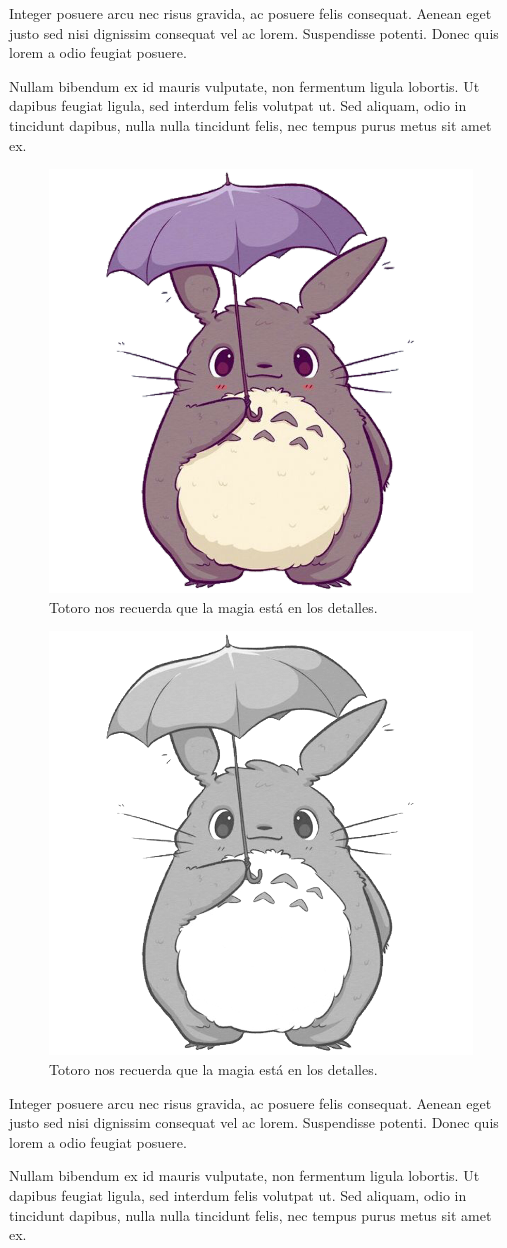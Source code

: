 Integer posuere arcu nec risus gravida, ac posuere felis consequat. Aenean eget justo sed nisi dignissim consequat vel ac lorem. Suspendisse potenti. Donec quis lorem a odio feugiat posuere.

Nullam bibendum ex id mauris vulputate, non fermentum ligula lobortis. Ut dapibus feugiat ligula, sed interdum felis volutpat ut. Sed aliquam, odio in tincidunt dapibus, nulla nulla tincidunt felis, nec tempus purus metus sit amet ex.

\ifPDF
\begin{figure}[!ht]
\centering
\includegraphics[width=.5\textwidth]{./media/avatar.png}
\caption{Totoro nos recuerda que la magia está en los detalles.}\label{figura3-1}
\end{figure}
	\else
	\ifBNPDF
	\begin{figure}[!ht]
	\centering
	\includegraphics[width=.5\textwidth]{./media/avatar2.png}
	\caption{Totoro nos recuerda que la magia está en los detalles.}\label{figura3-1}
	\end{figure}
	\fi
\fi

Integer posuere arcu nec risus gravida, ac posuere felis consequat. Aenean eget justo sed nisi dignissim consequat vel ac lorem. Suspendisse potenti. Donec quis lorem a odio feugiat posuere.

Nullam bibendum ex id mauris vulputate, non fermentum ligula lobortis. Ut dapibus feugiat ligula, sed interdum felis volutpat ut. Sed aliquam, odio in tincidunt dapibus, nulla nulla tincidunt felis, nec tempus purus metus sit amet ex.
